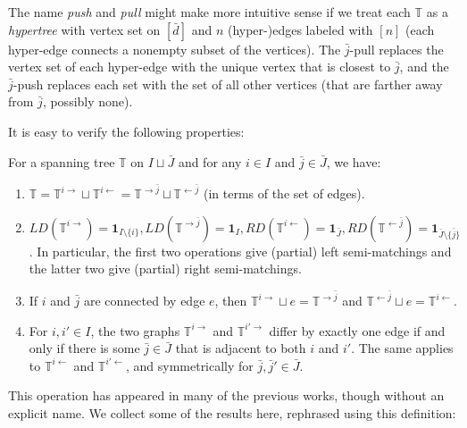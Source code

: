 \documentclass[letterpaper,reqno,11pt]{amsart}
\begin{document}
\begin{remark}\label{rem:hypertree}
    The name \emph{push} and \emph{pull} might make more intuitive sense if we treat each $\mathbb{T}$ as a \emph{hypertree} with vertex set on $[\bar{d}]$ and $n$ (hyper-)edges labeled with $[n]$ (each hyper-edge connects a nonempty subset of the vertices). The $\bar{j}$-pull replaces the vertex set of each hyper-edge with the unique vertex that is closest to $\bar{j}$, and the $\bar{j}$-push replaces each set with the set of all other vertices (that are farther away from $\bar{j}$, possibly none).
\end{remark}

It is easy to verify the following properties:

\begin{lemma}\label{lem:pushpull}
    For a spanning tree $\mathbb{T}$ on $I\sqcup \bar{J}$ and for any $i\in I$ and $\bar{j}\in \bar{J}$, we have:
    \begin{enumerate}
        \item[(a)] $\mathbb{T} = \mathbb{T}^{i\rightarrow} \sqcup \mathbb{T}^{i\leftarrow} = \mathbb{T}^{\rightarrow\bar{j}} \sqcup \mathbb{T}^{\leftarrow\bar{j}}$ (in terms of the set of edges).
        \item[(b)] $LD(\mathbb{T}^{i\rightarrow}) = \mathbf{1}_{I\setminus \{i\}}, LD(\mathbb{T}^{\rightarrow\bar{j}}) = \mathbf{1}_{I}, RD(\mathbb{T}^{i\leftarrow}) = \mathbf{1}_{\bar{J}}, RD(\mathbb{T}^{\leftarrow\bar{j}}) = \mathbf{1}_{\bar{J}\setminus \{\bar{j}\}}$. In particular, the first two operations give (partial) left semi-matchings and the latter two give (partial) right semi-matchings.
        \item[(c)] If $i$ and $\bar{j}$ are connected by edge $e$, then $\mathbb{T}^{i\rightarrow} \sqcup e = \mathbb{T}^{\rightarrow\bar{j}}$ and $\mathbb{T}^{\leftarrow\bar{j}} \sqcup e = \mathbb{T}^{i\leftarrow}$.
        \item[(d)] For $i, i'\in I$, the two graphs $\mathbb{T}^{i\rightarrow}$ and $\mathbb{T}^{i'\rightarrow}$ differ by exactly one edge if and only if there is some $\bar{j}\in \bar{J}$ that is adjacent to both $i$ and $i'$. The same applies to $\mathbb{T}^{i\leftarrow}$ and $\mathbb{T}^{i'\leftarrow}$, and symmetrically for $\bar{j}, \bar{j}'\in \bar{J}$.
    \end{enumerate}
\end{lemma}

This operation has appeared in many of the previous works, though without an explicit name. We collect some of the results here, rephrased using this definition:
\end{document}
